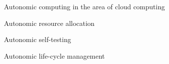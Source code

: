 
Autonomic computing in the area of cloud computing

Autonomic resource allocation 
\cite{inproceedingshu2009}
\cite{Casalicchio:2013:ARP:2494621.2494623}

Autonomic self-testing
\cite{5463688}


Autonomic life-cycle management






